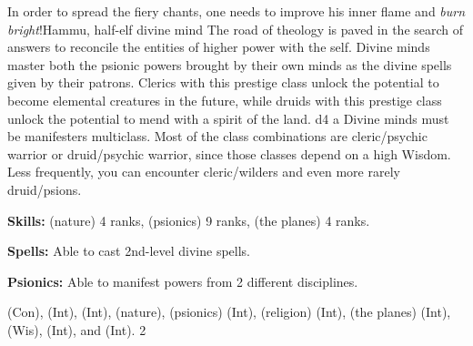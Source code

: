 {In order to spread the fiery chants, one needs to improve his inner flame and \emph{burn bright}!}{Hammu, half-elf divine mind}
{
The road of theology is paved in the search of answers to reconcile the entities of higher power with the self. Divine minds master both the psionic powers brought by their own minds as the divine spells given by their patrons. Clerics with this prestige class unlock the potential to become elemental creatures in the future, while druids with this prestige class unlock the potential to mend with a spirit of the land.
}
{d4}
{a}
{Divine minds must be manifesters multiclass. Most of the class combinations are cleric/psychic warrior or druid/psychic warrior, since those classes depend on a high Wisdom. Less frequently, you can encounter cleric/wilders and even more rarely druid/psions.}
{
\textbf{Skills:}  (nature) 4 ranks,  (psionics) 9 ranks,  (the planes) 4 ranks.

\textbf{Spells:} Able to cast 2nd-level divine spells.

\textbf{Psionics:} Able to manifest powers from 2 different disciplines.
}
{
 (Con),  (Int),  (Int),  (nature),  (psionics) (Int),  (religion) (Int),  (the planes) (Int),  (Wis),  (Int), and  (Int).
}
{2}
